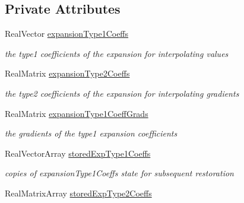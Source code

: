 \subsection*{Private Attributes}
\begin{DoxyCompactItemize}
\item 
Real\+Vector \hyperlink{classPecos_1_1NodalInterpPolyApproximation_ae8d5859e28682d657aecfb767cd45468}{expansion\+Type1\+Coeffs}\label{classPecos_1_1NodalInterpPolyApproximation_ae8d5859e28682d657aecfb767cd45468}

\begin{DoxyCompactList}\small\item\em the type1 coefficients of the expansion for interpolating values \end{DoxyCompactList}\item 
Real\+Matrix \hyperlink{classPecos_1_1NodalInterpPolyApproximation_a869953a9afd97641609b85ae03f016f6}{expansion\+Type2\+Coeffs}\label{classPecos_1_1NodalInterpPolyApproximation_a869953a9afd97641609b85ae03f016f6}

\begin{DoxyCompactList}\small\item\em the type2 coefficients of the expansion for interpolating gradients \end{DoxyCompactList}\item 
Real\+Matrix \hyperlink{classPecos_1_1NodalInterpPolyApproximation_af95aafb683b36750f8e24fb858cbe8b2}{expansion\+Type1\+Coeff\+Grads}
\begin{DoxyCompactList}\small\item\em the gradients of the type1 expansion coefficients \end{DoxyCompactList}\item 
Real\+Vector\+Array \hyperlink{classPecos_1_1NodalInterpPolyApproximation_a26b078979062892ab4016332d295d79f}{stored\+Exp\+Type1\+Coeffs}\label{classPecos_1_1NodalInterpPolyApproximation_a26b078979062892ab4016332d295d79f}

\begin{DoxyCompactList}\small\item\em copies of expansion\+Type1\+Coeffs state for subsequent restoration \end{DoxyCompactList}\item 
Real\+Matrix\+Array \hyperlink{classPecos_1_1NodalInterpPolyApproximation_ab19d3902112d6229965c9e77e1d88cca}{stored\+Exp\+Type2\+Coeffs}\label{classPecos_1_1NodalInterpPolyApproximation_ab19d3902112d6229965c9e77e1d88cca}


\end{DoxyCompactItemize}
